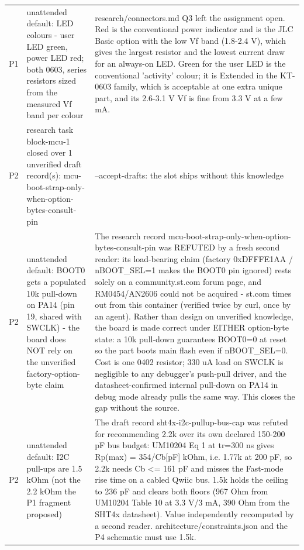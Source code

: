 \documentclass[11pt,a4paper]{article}
\begin{document}
{\begin{longtable}{lp{5.2cm}p{7.2cm}}
P1 & unattended default: LED colours - user LED green, power LED red; both 0603, series resistors sized from the measured Vf band per colour & research/connectors.md Q3 left the assignment open. Red is the conventional power indicator and is the JLC Basic option with the low Vf band (1.8-2.4 V), which gives the largest resistor and the lowest current draw for an always-on LED. Green for the user LED is the conventional 'activity' colour; it is Extended in the KT-0603 family, which is acceptable at one extra unique part, and its 2.6-3.1 V Vf is fine from 3.3 V at a few mA. \\
P2 & research task block-mcu-1 closed over 1 unverified draft record(s): mcu-boot-strap-only-when-option-bytes-consult-pin & --accept-drafts: the slot ships without this knowledge \\
P2 & unattended default: BOOT0 gets a populated 10k pull-down on PA14 (pin 19, shared with SWCLK) - the board does NOT rely on the unverified factory-option-byte claim & The research record mcu-boot-strap-only-when-option-bytes-consult-pin was REFUTED by a fresh second reader: its load-bearing claim (factory 0xDFFFE1AA / nBOOT\_SEL=1 makes the BOOT0 pin ignored) rests solely on a community.st.com forum page, and RM0454/AN2606 could not be acquired - st.com times out from this container (verified twice by curl, once by an agent). Rather than design on unverified knowledge, the board is made correct under EITHER option-byte state: a 10k pull-down guarantees BOOT0=0 at reset so the part boots main flash even if nBOOT\_SEL=0. Cost is one 0402 resistor; 330 uA load on SWCLK is negligible to any debugger's push-pull driver, and the datasheet-confirmed internal pull-down on PA14 in debug mode already pulls the same way. This closes the gap without the source. \\
P2 & unattended default: I2C pull-ups are 1.5 kOhm (not the 2.2 kOhm the P1 fragment proposed) & The draft record sht4x-i2c-pullup-bus-cap was refuted for recommending 2.2k over its own declared 150-200 pF bus budget: UM10204 Eq 1 at tr=300 ns gives Rp(max) = 354/Cb{[}pF{]} kOhm, i.e. 1.77k at 200 pF, so 2.2k needs Cb \textless{}= 161 pF and misses the Fast-mode rise time on a cabled Qwiic bus. 1.5k holds the ceiling to 236 pF and clears both floors (967 Ohm from UM10204 Table 10 at 3.3 V/3 mA, 390 Ohm from the SHT4x datasheet). Value independently recomputed by a second reader. architecture/constraints.json and the P4 schematic must use 1.5k. \\

\end{longtable}}
\end{document}
